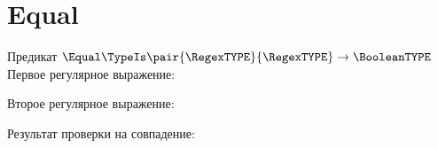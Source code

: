 \section{Equal}
\begin{frame}{Предикат $\Equal\TypeIs\pair{\RegexTYPE}{\RegexTYPE}\to\BooleanTYPE$}
	Первое регулярное выражение:

	Второе регулярное выражение:

	Результат проверки на совпадение:

\end{frame}
